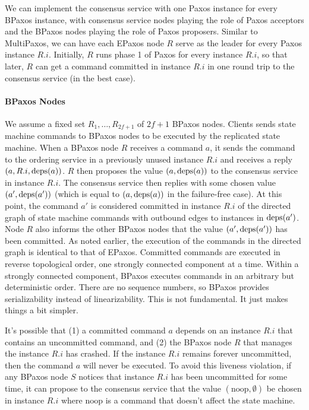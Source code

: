 \documentclass{mwhittaker}
\begin{document}
We can implement the consensus service with one Paxos instance for every BPaxos
instance, with consensus service nodes playing the role of Paxos acceptors and
the BPaxos nodes playing the role of Paxos proposers. Similar to MultiPaxos, we
can have each EPaxos node $R$ serve as the leader for every Paxos instance
$R.i$. Initially, $R$ runs phase 1 of Paxos for every instance $R.i$, so that
later, $R$ can get a command committed in instance $R.i$ in one round trip to
the consensus service (in the best case).

\paragraph{BPaxos Nodes}
We assume a fixed set $R_1, \ldots, R_{2f+1}$ of $2f + 1$ BPaxos nodes.
%
Clients sends state machine commands to BPaxos nodes to be executed by the
replicated state machine. When a BPaxos node $R$ receives a command $a$, it
sends the command to the ordering service in a previously unused instance $R.i$
and receives a reply $(a, R.i, \text{deps}(a))$. $R$ then proposes the value $(a,
\text{deps}(a))$ to the consensus service in instance $R.i$. The consensus service
then replies with some chosen value $(a', \text{deps}(a'))$ (which is equal to $(a,
\text{deps}(a))$ in the failure-free case). At this point, the command $a'$ is
considered committed in instance $R.i$ of the directed graph of state machine
commands with outbound edges to instances in $\text{deps}(a')$. Node $R$ also informs
the other BPaxos nodes that the value $(a', \text{deps}(a'))$ has been committed. As
noted earlier, the execution of the commands in the directed graph is identical
to that of EPaxos. Committed commands are executed in reverse topological
order, one strongly connected component at a time. Within a strongly connected
component, BPaxos executes commands in an arbitrary but deterministic order.
There are no sequence numbers, so BPaxos provides serializability instead of
linearizability. This is not fundamental. It just makes things a bit simpler.

\newcommand{\noop}{\text{noop}}
It's possible that (1) a committed command $a$ depends on an instance $R.i$
that contains an uncommitted command, and (2) the BPaxos node $R$ that manages
the instance $R.i$ has crashed. If the instance $R.i$ remains forever
uncommitted, then the command $a$ will never be executed. To avoid this
liveness violation, if any BPaxos node $S$ notices that instance $R.i$ has been
uncommitted for some time, it can propose to the consensus service that the
value $(\noop, \emptyset)$ be chosen in instance $R.i$ where $\noop$ is a
command that doesn't affect the state machine.
\end{document}
